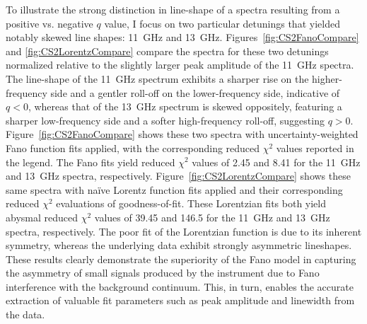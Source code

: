 To illustrate the strong distinction in line-shape of a spectra resulting from a positive vs. negative \(q\) value, I focus on two particular detunings that yielded notably skewed line shapes: \SI{11}{\giga\hertz} and \SI{13}{\giga\hertz}. Figures~\ref{fig:CS2FanoCompare} and \ref{fig:CS2LorentzCompare} compare the spectra for these two detunings normalized relative to the slightly larger peak amplitude of the \SI{11}{\giga\hertz} spectra. The line-shape of the \SI{11}{\giga\hertz} spectrum exhibits a sharper rise on the higher-frequency side and a gentler roll-off on the lower-frequency side, indicative of \(q<0\), whereas that of the \SI{13}{\giga\hertz} spectrum is skewed oppositely, featuring a sharper low-frequency side and a softer high-frequency roll-off, suggesting \(q>0\). Figure~\ref{fig:CS2FanoCompare} shows these two spectra with uncertainty-weighted Fano function fits applied, with the corresponding reduced \(\chi^{2}\) values reported in the legend. The Fano fits yield reduced \(\chi^{2}\) values of 2.45 and 8.41 for the \SI{11}{\giga\hertz} and \SI{13}{\giga\hertz} spectra, respectively. Figure~\ref{fig:CS2LorentzCompare} shows these same spectra with naïve Lorentz function fits applied and their corresponding reduced \(\chi^{2}\) evaluations of goodness-of-fit. These Lorentzian fits both yield abysmal reduced \(\chi^{2}\) values of 39.45 and 146.5 for the \SI{11}{\giga\hertz} and \SI{13}{\giga\hertz} spectra, respectively. The poor fit of the Lorentzian function is due to its inherent symmetry, whereas the underlying data exhibit strongly asymmetric lineshapes. These results clearly demonstrate the superiority of the Fano model in capturing the asymmetry of small signals produced by the instrument due to Fano interference with the background continuum. This, in turn, enables the accurate extraction of valuable fit parameters such as peak amplitude and linewidth from the data.


